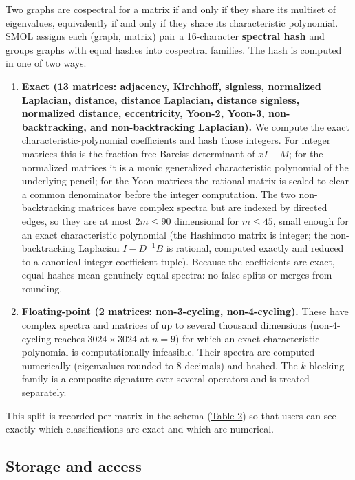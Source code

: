 \documentclass[
]{article}
\begin{document}
Two graphs are cospectral for a matrix if and only if they share its
multiset of eigenvalues, equivalently if and only if they share its
characteristic polynomial. SMOL assigns each (graph, matrix) pair a
16-character \textbf{spectral hash} and groups graphs with equal hashes
into cospectral families. The hash is computed in one of two ways.

\begin{enumerate}
\def\labelenumi{\arabic{enumi}.}
\item
  \textbf{Exact (13 matrices: adjacency, Kirchhoff, signless, normalized
  Laplacian, distance, distance Laplacian, distance signless, normalized
  distance, eccentricity, Yoon-2, Yoon-3, non-backtracking, and
  non-backtracking Laplacian).} We compute the exact
  characteristic-polynomial coefficients and hash those integers. For
  integer matrices this is the fraction-free Bareiss determinant of
  \(xI - M\); for the normalized matrices it is a monic generalized
  characteristic polynomial of the underlying pencil; for the Yoon
  matrices the rational matrix is scaled to clear a common denominator
  before the integer computation. The two non-backtracking matrices have
  complex spectra but are indexed by directed edges, so they are at most
  \(2m \le 90\) dimensional for \(m \le 45\), small enough for an exact
  characteristic polynomial (the Hashimoto matrix is integer; the
  non-backtracking Laplacian \(I - D^{-1}B\) is rational, computed
  exactly and reduced to a canonical integer coefficient tuple). Because
  the coefficients are exact, equal hashes mean genuinely equal spectra:
  no false splits or merges from rounding.
\item
  \textbf{Floating-point (2 matrices: non-3-cycling, non-4-cycling).}
  These have complex spectra and matrices of up to several thousand
  dimensions (non-4-cycling reaches \(3024 \times 3024\) at \(n = 9\))
  for which an exact characteristic polynomial is computationally
  infeasible. Their spectra are computed numerically (eigenvalues
  rounded to 8 decimals) and hashed. The \(k\)-blocking family is a
  composite signature over several operators and is treated separately.
\end{enumerate}

This split is recorded per matrix in the schema
(\hyperref[tbl-matrices]{Table 2}) so that users can see exactly which
classifications are exact and which are numerical.

\subsection{Storage and access}\label{sec-storage}
\end{document}
